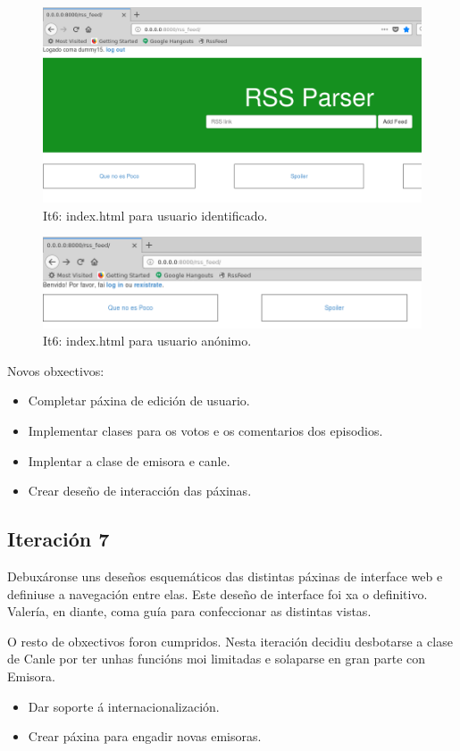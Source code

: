 \begin{figure}[H]
	\centering
	\includegraphics[scale=0.4,keepaspectratio=true]{./images/it6_log.png}
	\caption{It6: index.html para usuario identificado.}
	\label{fig:it6_log}
\end{figure}

\begin{figure}[H]
	\centering
	\includegraphics[scale=0.5,keepaspectratio=true]{./images/it6_anon.png}
	\caption{It6: index.html para usuario anónimo.}
	\label{fig:it6_anon}
\end{figure}

Novos obxectivos:
\begin{itemize}
	\item Completar páxina de edición de usuario.
	\item Implementar clases para os votos e os comentarios dos episodios.
	\item Implentar a clase de emisora e canle.
	\item Crear deseño de interacción das páxinas.
\end{itemize}

\subsection{Iteración 7}

Debuxáronse uns deseños esquemáticos das distintas páxinas de interface web e definiuse a navegación entre elas. Este deseño de interface foi xa o definitivo. Valería, en diante, coma guía para confeccionar as distintas vistas.

O resto de obxectivos foron cumpridos. Nesta iteración decidiu desbotarse a clase de Canle por ter unhas funcións moi limitadas e solaparse en gran parte con Emisora.

\begin{itemize}
	\item Dar soporte á internacionalización.
	\item Crear páxina para engadir novas emisoras.
\end{itemize}


